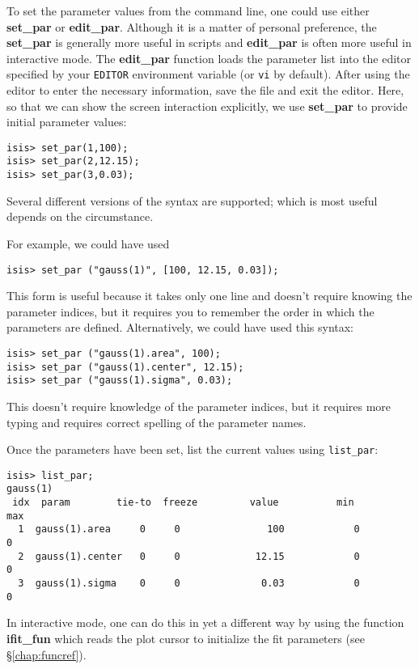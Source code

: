 \documentclass{book}
\begin{document}
To set the parameter values from the command line, one could use
either {\bf set\_par} or {\bf edit\_par}.  Although it is a matter
of personal preference, the {\bf set\_par} is generally more
useful in scripts and {\bf edit\_par} is often more useful in
interactive mode.  The {\bf edit\_par} function loads the
parameter list into the editor specified by your {\tt EDITOR}
environment variable (or {\tt vi} by default). After using the
editor to enter the necessary information, save the file and exit
the editor. Here, so that we can show the screen interaction
explicitly, we use {\bf set\_par} to provide initial parameter
values:
\begin{verbatim}
isis> set_par(1,100);
isis> set_par(2,12.15);
isis> set_par(3,0.03);
\end{verbatim}
Several different versions of the syntax are supported; which
is most useful depends on the circumstance.

For example, we could have used
\begin{verbatim}
isis> set_par ("gauss(1)", [100, 12.15, 0.03]);
\end{verbatim}
This form is useful because it takes only one line and doesn't
require knowing the parameter indices, but it requires you to
remember the order in which the parameters are defined.
Alternatively, we could have used this syntax:
\begin{verbatim}
isis> set_par ("gauss(1).area", 100);
isis> set_par ("gauss(1).center", 12.15);
isis> set_par ("gauss(1).sigma", 0.03);
\end{verbatim}
This doesn't require knowledge of the parameter indices, but it
requires more typing and requires correct spelling of the
parameter names.

Once the parameters have been set, list the current values
using \verb|list_par|:
\begin{verbatim}
isis> list_par;
gauss(1)
 idx  param        tie-to  freeze         value          min          max
  1  gauss(1).area     0     0               100            0            0
  2  gauss(1).center   0     0             12.15            0            0
  3  gauss(1).sigma    0     0              0.03            0            0
\end{verbatim}
In interactive mode, one can do this in yet a different way
by using the function {\bf ifit\_fun} which reads
the plot cursor to initialize the fit parameters
(see \S\ref{chap:funcref}).
\end{document}
